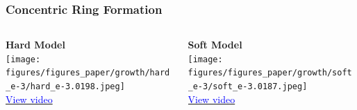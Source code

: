 \documentclass[10pt,t]{beamer}
\begin{document}
\begin{frame}
    \frametitle{Concentric Ring Formation}

    \begin{columns}[c]
        \begin{column}{0.48\textwidth}
            \centering
            \textbf{Hard Model}\\[0.3em]
            {\texttt{[image: figures/figures\_paper/growth/hard\_e-3/hard\_e-3.0198.jpeg]}}\\[0.6em]
            \small
            \href{https://home.cit.tum.de/~ler/bacteria/videos/hard_e-3.mp4}{\textcolor{blue}{{View video}}}
        \end{column}

        \begin{column}{0.48\textwidth}
            \centering
            \textbf{Soft Model}\\[0.3em]
            {\texttt{[image: figures/figures\_paper/growth/soft\_e-3/soft\_e-3.0187.jpeg]}}\\[0.6em]
            \small
            \href{https://home.cit.tum.de/~ler/bacteria/videos/soft_e-3.mp4}{\textcolor{blue}{{View video}}}
        \end{column}
    \end{columns}
\end{frame}


\end{document}
